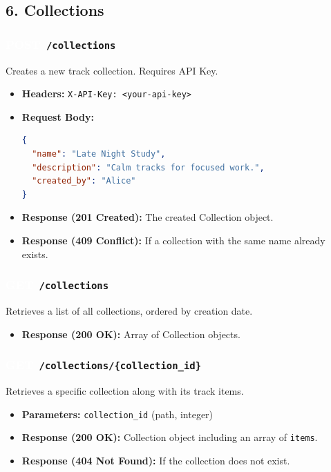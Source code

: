 \documentclass[11pt,a4paper]{article}
\newcommand{\methodGET}{\colorbox{getcolor}{\textcolor{white}{\textbf{GET}}}}
\newcommand{\methodPOST}{\colorbox{postcolor}{\textcolor{white}{\textbf{POST}}}}
\begin{document}
\subsection{6. Collections}

\subsubsection*{\methodPOST \texttt{ /collections}}
Creates a new track collection. Requires API Key.
\begin{itemize}[label=\textcolor{primary}{\textbullet}, noitemsep]
    \item \textbf{Headers:} \texttt{X-API-Key: <your-api-key>}
    \item \textbf{Request Body:}
\begin{lstlisting}[language=json]
{
  "name": "Late Night Study",
  "description": "Calm tracks for focused work.",
  "created_by": "Alice"
}
\end{lstlisting}
    \item \textbf{Response (201 Created):} The created Collection object.
    \item \textbf{Response (409 Conflict):} If a collection with the same name already exists.
\end{itemize}

\subsubsection*{\methodGET \texttt{ /collections}}
Retrieves a list of all collections, ordered by creation date.
\begin{itemize}[label=\textcolor{primary}{\textbullet}, noitemsep]
    \item \textbf{Response (200 OK):} Array of Collection objects.
\end{itemize}

\subsubsection*{\methodGET \texttt{ /collections/\{collection\_id\}}}
Retrieves a specific collection along with its track items.
\begin{itemize}[label=\textcolor{primary}{\textbullet}, noitemsep]
    \item \textbf{Parameters:} \texttt{collection\_id} (path, integer)
    \item \textbf{Response (200 OK):} Collection object including an array of \texttt{items}.
    \item \textbf{Response (404 Not Found):} If the collection does not exist.
\end{itemize}
\end{document}
